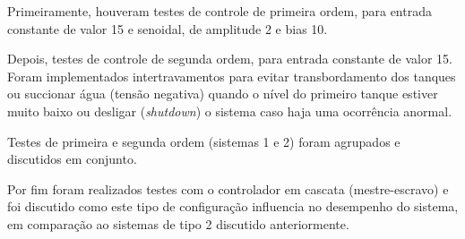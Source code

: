 

Primeiramente, houveram testes de controle de primeira ordem, para entrada constante de valor 15 e senoidal, de amplitude 2 e bias 10.

Depois, testes de controle de segunda ordem, para entrada constante de valor 15. Foram implementados intertravamentos para evitar transbordamento dos tanques ou succionar água (tensão negativa) quando o nível do primeiro tanque estiver muito baixo ou desligar (\emph{shutdown}) o sistema caso haja uma ocorrência anormal.

Testes de primeira e segunda ordem (sistemas 1 e 2) foram agrupados e discutidos em conjunto.

Por fim foram realizados testes com o controlador em cascata (mestre-escravo) e foi discutido como este tipo de configuração influencia no desempenho do sistema, em comparação ao sistemas de tipo 2 discutido anteriormente.


% 
% 
% 

% 
% 
% 
% 

% 
% 
\newpage
%
% 
